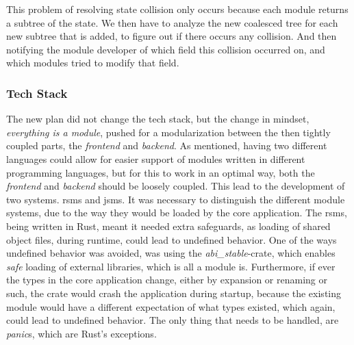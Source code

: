 This problem of resolving state collision only occurs because each module
returns a subtree of the state. We then have to analyze the new coalesced tree
for each new subtree that is added, to figure out if there occurs any collision.
And then notifying the module developer of which field this collision occurred
on, and which modules tried to modify that field.

\subsubsection{Tech Stack}

The new plan did not change the tech stack, but the change in mindset,
 \textit{everything is a module}, pushed for a
modularization between the then tightly coupled parts, the \textit{frontend} and
\textit{backend}. As mentioned, having two different languages could allow for
easier support of modules written in different programming languages, but for
this to work in an optimal way, both
the \textit{frontend} and \textit{backend} should be loosely coupled. This lead
to the development of two systems. \gls{rsms} and \gls{jsms}.
It was necessary to distinguish the different module systems, due to the way
they would be loaded by the core application.
The \gls{rsms}, being written in Rust, meant it needed extra safeguards, as
loading of shared object files, during runtime, could lead to undefined
behavior.
One of the ways undefined behavior was avoided, was using the
\textit{abi\_stable}-crate, which enables \textit{safe} loading of external
libraries, which is all a module is.
Furthermore, if ever the types in the core application change, either by
expansion or renaming or such, the crate would crash the application during
startup, because the existing module would have a different expectation of what
types existed, which again, could lead to undefined behavior. The only thing
that needs to be handled, are \textit{panic}s, which are Rust's exceptions.

